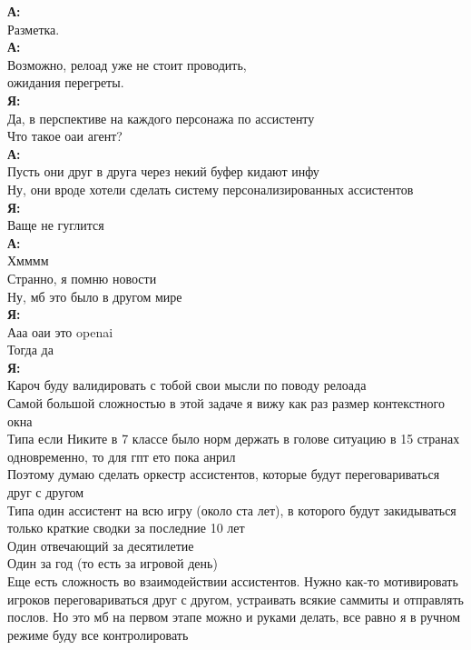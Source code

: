 \textbf{А:}\\
Разметка. \\

\textbf{А:}\\
Возможно, релоад уже не стоит проводить, \\
ожидания перегреты. \\

\textbf{Я:}\\
Да, в перспективе на каждого персонажа по ассистенту\\
Что такое оаи агент?\\

\textbf{А:}\\
Пусть они друг в друга через некий буфер кидают инфу\\
Ну, они вроде хотели сделать систему персонализированных ассистентов\\

\textbf{Я:}\\
Ваще не гуглится\\

\textbf{А:}\\
Хмммм\\
Странно, я помню новости\\
Ну, мб это было в другом мире\\

\textbf{Я:}\\
Ааа оаи это openai\\
Тогда да\\

\textbf{Я:}\\
Кароч буду валидировать с тобой свои мысли по поводу релоада\\
Самой большой сложностью в этой задаче я вижу как раз размер контекстного окна\\
Типа если Никите в 7 классе было норм держать в голове ситуацию в 15 странах одновременно, то для гпт ето пока анрил\\
Поэтому думаю сделать оркестр ассистентов, которые будут переговариваться друг с другом\\
Типа один ассистент на всю игру (около ста лет), в которого будут закидываться только краткие сводки за последние 10 лет\\
Один отвечающий за десятилетие\\
Один за год (то есть за игровой день)\\
Еще есть сложность во взаимодействии ассистентов. Нужно как-то мотивировать игроков переговариваться друг с другом, устраивать всякие саммиты и отправлять послов. Но это мб на первом этапе можно и руками делать, все равно я в ручном режиме буду все контролировать\\

